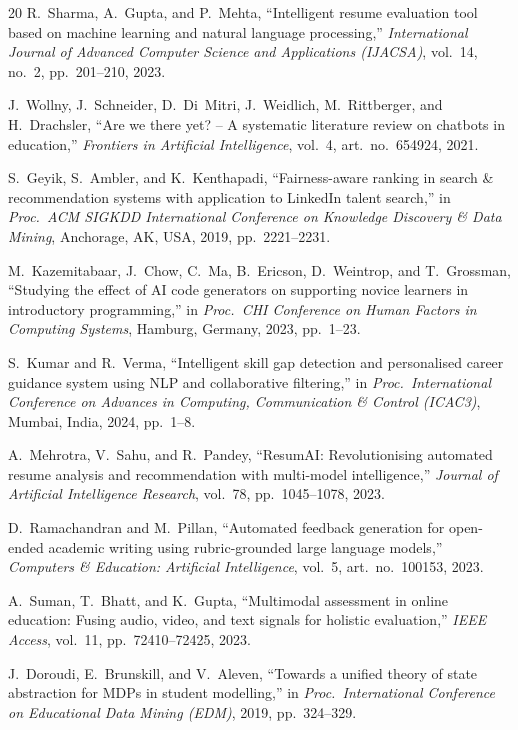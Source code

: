 \documentclass[12pt,a4paper]{report}
\begin{document}
\begin{thebibliography}{20}
R.~Sharma, A.~Gupta, and P.~Mehta,
``Intelligent resume evaluation tool based on machine learning and natural language processing,''
\textit{International Journal of Advanced Computer Science and Applications (IJACSA)}, vol.~14, no.~2, pp.~201--210, 2023.

J.~Wollny, J.~Schneider, D.~Di~Mitri, J.~Weidlich, M.~Rittberger, and H.~Drachsler,
``Are we there yet? -- A systematic literature review on chatbots in education,''
\textit{Frontiers in Artificial Intelligence}, vol.~4, art.\ no.\ 654924, 2021.

S.~Geyik, S.~Ambler, and K.~Kenthapadi,
``Fairness-aware ranking in search \& recommendation systems with application to LinkedIn talent search,''
in \textit{Proc.\ ACM SIGKDD International Conference on Knowledge Discovery \& Data Mining}, Anchorage, AK, USA, 2019, pp.~2221--2231.

M.~Kazemitabaar, J.~Chow, C.~Ma, B.~Ericson, D.~Weintrop, and T.~Grossman,
``Studying the effect of AI code generators on supporting novice learners in introductory programming,''
in \textit{Proc.\ CHI Conference on Human Factors in Computing Systems}, Hamburg, Germany, 2023, pp.~1--23.

S.~Kumar and R.~Verma,
``Intelligent skill gap detection and personalised career guidance system using NLP and collaborative filtering,''
in \textit{Proc.\ International Conference on Advances in Computing, Communication \& Control (ICAC3)}, Mumbai, India, 2024, pp.~1--8.

A.~Mehrotra, V.~Sahu, and R.~Pandey,
``ResumAI: Revolutionising automated resume analysis and recommendation with multi-model intelligence,''
\textit{Journal of Artificial Intelligence Research}, vol.~78, pp.~1045--1078, 2023.

D.~Ramachandran and M.~Pillan,
``Automated feedback generation for open-ended academic writing using rubric-grounded large language models,''
\textit{Computers \& Education: Artificial Intelligence}, vol.~5, art.\ no.\ 100153, 2023.

A.~Suman, T.~Bhatt, and K.~Gupta,
``Multimodal assessment in online education: Fusing audio, video, and text signals for holistic evaluation,''
\textit{IEEE Access}, vol.~11, pp.~72410--72425, 2023.

J.~Doroudi, E.~Brunskill, and V.~Aleven,
``Towards a unified theory of state abstraction for MDPs in student modelling,''
in \textit{Proc.\ International Conference on Educational Data Mining (EDM)}, 2019, pp.~324--329.


\end{thebibliography}
\end{document}
